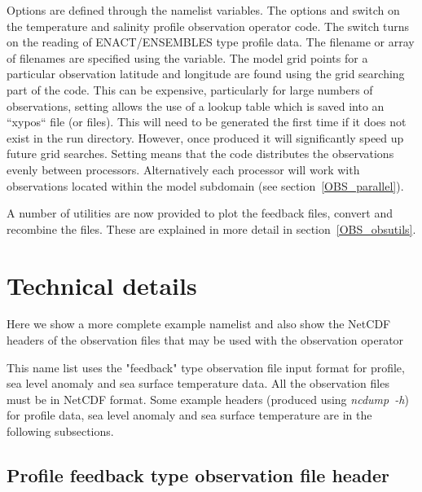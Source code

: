 \documentclass[NEMO_book]{subfiles}
\begin{document}
Options are defined through the   namelist variables.
The options  and  switch on the temperature and salinity
profile observation operator code. The  switch turns on the reading
of ENACT/ENSEMBLES type profile data. The filename or array of filenames are
specified using the  variable. The model grid points for a
particular  observation latitude and longitude are found using the grid
searching part of the code. This can be expensive, particularly for large
numbers of observations, setting  allows the use of
a lookup table which is saved into an ``xypos`` file (or files). This will need
to be generated the first time if it does not exist in the run directory.
However, once produced it will significantly speed up future grid searches.
Setting  means that the code distributes the observations
evenly between processors. Alternatively each processor will work with
observations located within the model subdomain (see section~\ref{OBS_parallel}).

A number of utilities are now provided to plot the feedback files, convert and
recombine the files. These are explained in more detail in section~\ref{OBS_obsutils}.

\section{Technical details}
\label{OBS_details}

Here we show a more complete example namelist   and also show the NetCDF headers
of the observation
files that may be used with the observation operator


This name list uses the "feedback" type observation file input format for
profile, sea level anomaly and sea surface temperature data. All the
observation files must be in NetCDF format. Some example headers (produced using
\mbox{\textit{ncdump~-h}}) for profile
data, sea level anomaly and sea surface temperature are in the following
subsections.

\subsection{Profile feedback type observation file header}
\end{document}
